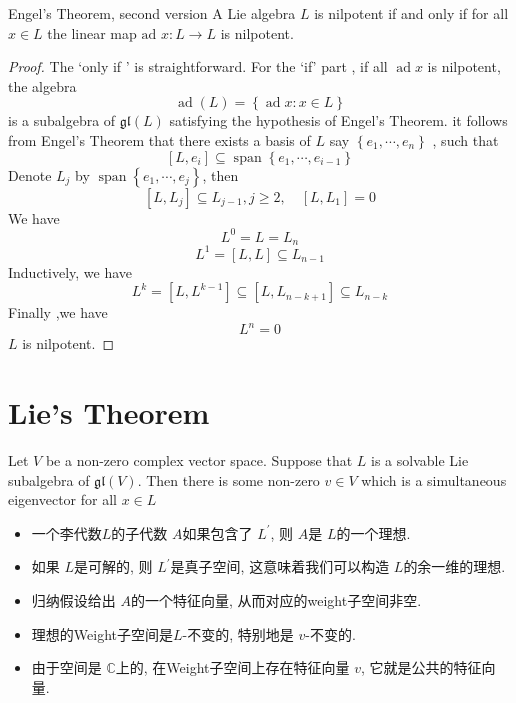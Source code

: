 \documentclass[../main.tex]{subfiles}
\begin{document}
\begin{theorem}{Engel's Theorem, second version}{}
A Lie algebra $L$ is nilpotent if and only if for all $x \in L$ the linear map $\text{ad } x : L \to L$ is nilpotent.
\end{theorem}
\begin{proof}
    The `only if ' is straightforward. 
    For the `if' part , if all \(  \operatorname{ad}x  \) is nilpotent, the algebra  \[
    \operatorname{ad}\left( L \right)= \left\{ \operatorname{ad}x: x\in L \right\} 
    \] is a subalgebra of \(  \mathfrak{gl}\left( L \right)  \) satisfying the hypothesis of Engel's Theorem.  it follows from Engel's Theorem that  there exists a basis of \( L  \) say \(  \left\{ e_1,\cdots ,e_{n} \right\}  \) , such that  \[
    [L, e_{i}]\subseteq \operatorname{span}\left\{ e_1,\cdots ,e_{i-1} \right\}
    \]   Denote \(  L_{j}  \) by \(  \operatorname{span}\left\{ e_1,\cdots ,e_{j} \right\}  \), then  \[
    [L, L_{j}]\subseteq L_{j-1}, j\ge 2,\quad \left[ L,L_1 \right]= 0 
    \]  We have \[
    L^{0}= L= L_{n}
    \] \[
    L^{1}= \left[ L, L \right]\subseteq L_{n-1}
    \] Inductively, we have \[
    L^{k}= [L, L^{k-1}]\subseteq [L,L_{n-k+ 1}]\subseteq L_{n-k}
    \]Finally ,we have \[
    L^{n}= 0
    \] \(  L  \) is nilpotent. 
\end{proof}

\section{Lie's Theorem}

\begin{proposition}{}{}
    Let $V$ be a non-zero complex vector space. Suppose that $L$ is a solvable Lie subalgebra of $\mathfrak{gl}(V)$. Then there is some non-zero $v \in V$ which is a simultaneous eigenvector for all $x \in L$
\end{proposition}
\begin{proofsketch}
  \begin{itemize}
    \item 一个李代数\(  L  \)的子代数 \(  A  \)如果包含了 \(  L^{\prime}   \), 则 \(  A  \)是 \(  L  \)的一个理想.
    \item 如果 \(  L  \)是可解的, 则 \(  L^{\prime}   \)是真子空间, 这意味着我们可以构造 \(  L  \)的余一维的理想.
    \item 归纳假设给出 \(  A  \)的一个特征向量, 从而对应的weight子空间非空.
    \item  理想的Weight子空间是\(  L  \)-不变的, 特别地是 \(  v  \)-不变的.
    \item 由于空间是 \(  \mathbb{C}   \)上的,  在Weight子空间上存在特征向量 \(  v  \), 它就是公共的特征向量.        
  \end{itemize}
  
\end{proofsketch}
\end{document}
